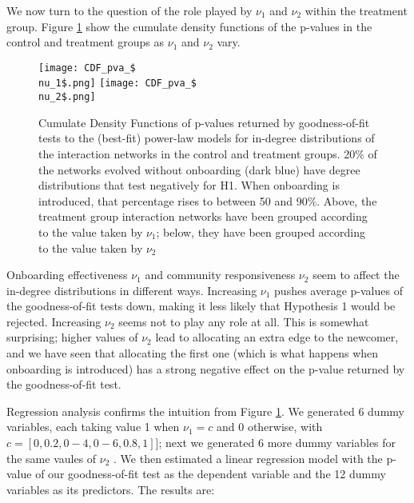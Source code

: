 We now turn to the question of the role played by $\nu_1$ and $\nu_2$ within the treatment group. Figure \ref{fig:CDFpva$\nu_1$$\nu_2$} show the cumulate density functions of the p-values in the control and treatment groups as $\nu_1$ and $\nu_2$ vary. 

\begin{figure}[thb]
\centering

	\texttt{[image: CDF\_pva\_\$\\nu\_1\$.png]}\label{fig:CDF$\nu_1$}
	\texttt{[image: CDF\_pva\_\$\\nu\_2\$.png]}\label{fig:CDF$\nu_2$}
  \caption{Cumulate Density Functions of p-values returned by goodness-of-fit tests to the (best-fit) power-law models for in-degree distributions of the interaction networks in the control and treatment groups. 20\% of the networks evolved without onboarding (dark blue) have degree distributions that test negatively for H1. When onboarding is introduced, that percentage rises to between 50 and 90\%. Above, the treatment group interaction networks have been grouped according to the value taken by $\nu_1$; below, they have been grouped according to the value taken by $\nu_2$ } 
 \label{fig:CDFpva$\nu_1$$\nu_2$}
\end{figure}

Onboarding effectiveness $\nu_1$ and community responsiveness $\nu_2$ seem to affect the in-degree distributions in different ways. Increasing $\nu_1$ pushes average p-values of the goodness-of-fit tests down, making it less likely that Hypothesis 1 would be rejected. Increasing $\nu_2$ seems not to play any role at all. This is somewhat surprising; higher values of $\nu_2$ lead to allocating an extra edge to the newcomer, and we have seen that allocating the first one (which is what happens when onboarding is introduced) has a strong negative effect on the p-value returned by the goodness-of-fit test. 

Regression analysis confirms the intuition from Figure \ref{fig:CDFpva$\nu_1$$\nu_2$}. We generated 6 dummy variables, each taking value 1 when $\nu_1 =  c$ and 0 otherwise, with $c = [0, 0.2, 0-4, 0-6, 0.8, 1]]$; next we generated 6 more dummy variables for the same vaules of $\nu_2$ . We then estimated a linear regression model with the p-value of our goodness-of-fit test as the dependent variable and the 12 dummy variables as its predictors. The results are:


